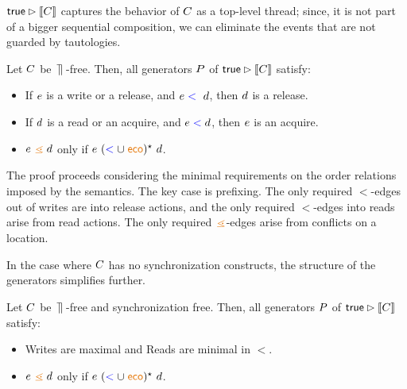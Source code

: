 $\mathsf{true}\mathbin\rhd \llbracket C\rrbracket$ captures the behavior of $C$ as a top-level thread; since, it is not part of a bigger sequential composition, we can eliminate the events that are not guarded by tautologies.
\begin{lemma}
Let $C$ be $\,\mathbin{\rrceil}\,$-free.  Then, all generators $P$ of $\mathsf{true}\mathbin\rhd \llbracket C\rrbracket$ satisfy:
\begin{itemize}
\item If $e$ is a write or a release, and $e \mathrel{{\color{blue}<}}\ d$, then $d$ is a release.
\item If $d$ is a read or an acquire, and $e \mathrel{{\color{blue}<}} d$, then $e$ is an acquire.
\item $\aEv \gtN \bEv$ only if $ \aEv\ (\lt \cup \reco)^{\star}  \  \bEv$.
\end{itemize}
\end{lemma}
The proof proceeds considering the minimal requirements on the order relations imposed by the semantics.  The key case is prefixing.  The only required $\lt$-edges out of writes are into release actions, and the only required $\lt$-edges into reads arise from read actions.  The only required $\gtN$-edges arise from conflicts on a location.

In the case where $C$ has no synchronization constructs, the structure of the generators simplifies further.
\begin{corollary}
Let $C$ be $\,\mathbin{\rrceil}\,$-free and synchronization free.  Then, all generators $P$ of $\mathsf{true}\mathbin\rhd \llbracket C\rrbracket$ satisfy:
\begin{itemize}
\item Writes are maximal and Reads are minimal in $\lt$.
\item $\aEv \gtN \bEv$ only if $ \aEv\ (\lt \cup \reco)^{\star} \  \bEv$.
\end{itemize}
\end{corollary}

